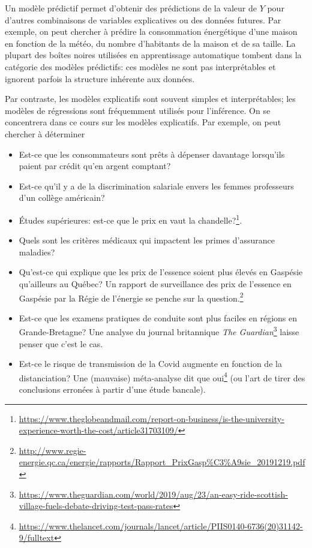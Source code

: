 \documentclass[
  11pt,
  letterpaper,
]{book}
\providecommand{\tightlist}{%
  \setlength{\itemsep}{0pt}\setlength{\parskip}{0pt}}
\renewcommand{\href}[2]{#2\footnote{\url{#1}}}
\theoremstyle{definition}
\theoremstyle{definition}
\theoremstyle{definition}
\theoremstyle{remark}
\begin{document}
Un modèle prédictif permet d'obtenir des prédictions de la valeur de \(Y\) pour d'autres combinaisons de variables explicatives ou des données futures. Par exemple, on peut chercher à prédire la consommation énergétique d'une maison en fonction de la météo, du nombre d'habitants de la maison et de sa taille. La plupart des boîtes noires utilisées en apprentissage automatique tombent dans la catégorie des modèles prédictifs: ces modèles ne sont pas interprétables et ignorent parfois la structure inhérente aux données.

Par contraste, les modèles explicatifs sont souvent simples et interprétables; les modèles de régressions sont fréquemment utilisés pour l'inférence. On se concentrera dans ce cours sur les modèles explicatifs. Par exemple, on peut chercher à déterminer

\begin{itemize}
\tightlist
\item
  Est-ce que les consommateurs sont prêts à dépenser davantage lorsqu'ils paient par crédit qu'en argent comptant?
\item
  Est-ce qu'il y a de la discrimination salariale envers les femmes professeurs d'un collège américain?
\item
  Études supérieures: \href{https://www.theglobeandmail.com/report-on-business/is-the-university-experience-worth-the-cost/article31703109/}{est-ce que le prix en vaut la chandelle?}.
\item
  Quels sont les critères médicaux qui impactent les primes d'assurance maladies?
\item
  Qu'est-ce qui explique que les prix de l'essence soient plus élevés en Gaspésie qu'ailleurs au Québec? \href{http://www.regie-energie.qc.ca/energie/rapports/Rapport_PrixGasp\%C3\%A9sie_20191219.pdf}{Un rapport de surveillance des prix de l'essence en Gaspésie par la Régie de l'énergie se penche sur la question.}
\item
  Est-ce que les examens pratiques de conduite sont plus faciles en régions en Grande-Bretagne? \href{https://www.theguardian.com/world/2019/aug/23/an-easy-ride-scottish-village-fuels-debate-driving-test-pass-rates}{Une analyse du journal britannique \emph{The Guardian}} laisse penser que c'est le cas.
\item
  Est-ce le risque de transmission de la Covid augmente en fonction de la distanciation? \href{https://www.thelancet.com/journals/lancet/article/PIIS0140-6736(20)31142-9/fulltext}{Une (mauvaise) méta-analyse dit que oui} (ou l'art de tirer des conclusions erronées à partir d'une étude bancale).
\end{itemize}
\end{document}
